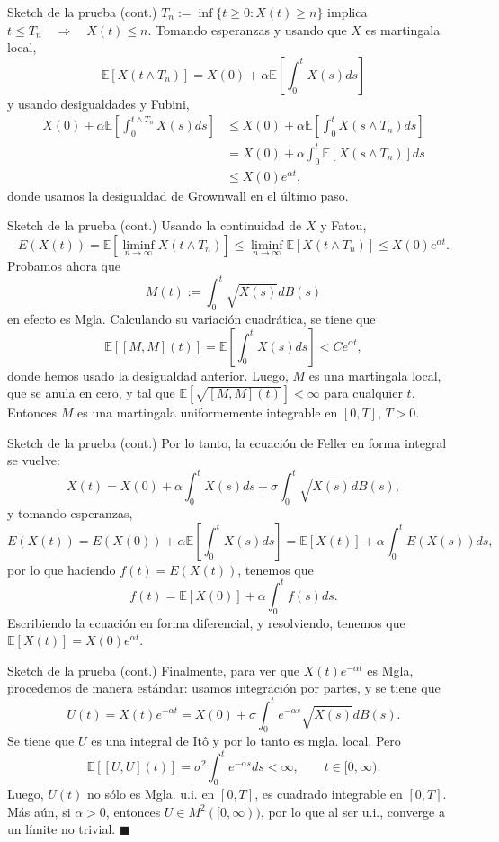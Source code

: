 \documentclass{beamer}
\renewcommand{\to}{\rightarrow}
\newcommand{\ent}{\Longrightarrow}
\newcommand{\E}{\mathbb{E}}
\renewcommand{\1}{\mathds{1}}
\renewcommand{\qedsymbol}{$\blacksquare$}
\theoremstyle{definition}
\theoremstyle{definition}
\theoremstyle{definition}
\theoremstyle{definition}
\theoremstyle{definition}
\begin{document}
\begin{frame}{Sketch de la prueba (cont.)}
    $T_n:=\inf\{t\geq0:X(t)\geq n\}$ implica $t\leq T_n \quad \ent \quad X(t)\leq n$. Tomando esperanzas y usando 
    que $X$ es martingala local,
    \[
    \E\left[X(t\wedge T_n)\right]=X(0)+\alpha \E\left[\int_{0}^{t}X(s)ds\right]    
    \] 
    y usando desigualdades y Fubini,
        \begin{align*}
            X(0)+\alpha \E\left[\int_{0}^{t\wedge T_n}X(s)ds\right]&\leq X(0)+\alpha \E\left[\int_{0}^{t}X(s\wedge T_n)ds\right]\\
            &=X(0)+\alpha \int_{0}^{t} \E\left[ X(s \wedge T_n) \right] ds\\
            &\leq X(0)e^{\alpha t},
    \end{align*}
    donde usamos la desigualdad de Grownwall en el último paso.
\end{frame}
\begin{frame}{Sketch de la prueba (cont.)}
    Usando la continuidad de $X$ y Fatou, 
    \[
        E(X(t))=\E\left[\liminf_{n\to\infty}X(t\wedge T_n)\right]\leq \liminf_{n\to\infty}\E\left[X(t\wedge T_n)\right]\leq X(0)e^{\alpha t}.
    \]
    Probamos ahora que
    \[
    M(t):=\int_{0}^{t}\sqrt{X(s)}dB(s)    
    \] 
    en efecto es Mgla. Calculando su variación cuadrática, se tiene que 
    \[
        \E\left[[M,M](t)\right]=\E\left[\int_{0}^{t}X(s)ds\right]<Ce^{\alpha t},
    \]
    donde hemos usado la desigualdad anterior. Luego, $M$ es una martingala local, que 
    se anula en cero, y tal que $\E\left[\sqrt{[M,M](t)}\right]<\infty$ para cualquier $t$.
    Entonces $M$ es una martingala uniformemente integrable en $[0,T]$, $T>0$.
\end{frame}
\begin{frame}{Sketch de la prueba (cont.)}
    Por lo tanto, la ecuación de Feller en forma integral se vuelve:
    \[
    X(t)=X(0)+\alpha\int_{0}^{t}X(s)ds+\sigma\int_{0}^{t}\sqrt{X(s)}dB(s),    
    \]
    y tomando esperanzas,
    \[
    E(X(t))=E(X(0))+\alpha \E\left[\int_{0}^{t}X(s)ds\right]=\E\left[X(t)\right]+\alpha\int_{0}^{t}E(X(s))ds,    
    \]
    por lo que haciendo $f(t)=E(X(t))$, tenemos que 
    \[
    f(t)=\E\left[X(0)\right]+\alpha\int_{0}^{t}f(s)ds.     
    \]
    Escribiendo la ecuación en forma diferencial, y resolviendo, tenemos que 
    $\E\left[X(t)\right]=X(0)e^{\alpha t}$.
\end{frame}
\begin{frame}{Sketch de la prueba (cont.)}
    Finalmente, para ver que $X(t)e^{-\alpha t}$ es Mgla, procedemos de manera estándar:
    usamos integración por partes, y se tiene que 
    \[
    U(t)=X(t)e^{-\alpha t}=X(0)+\sigma \int_{0}^{t}e^{-\alpha s}\sqrt{X(s)}dB(s).    
    \]
    Se tiene que $U$ es una integral de Itô y por lo tanto es mgla. local. Pero 
    \[
    \E\left[[U,U](t)\right]=\sigma^2\int_{0}^{t}e^{-\alpha s}ds<\infty, \qquad t\in [0,\infty).
    \]
    Luego, $U(t)$ no sólo es Mgla. u.i. en $[0,T]$, es cuadrado integrable en $[0,T]$.
    Más aún, si $\alpha>0$, entonces $U\in M^2([0,\infty))$, por lo que 
    al ser u.i., converge a un límite no trivial. \qedsymbol
\end{frame}
\end{document}
